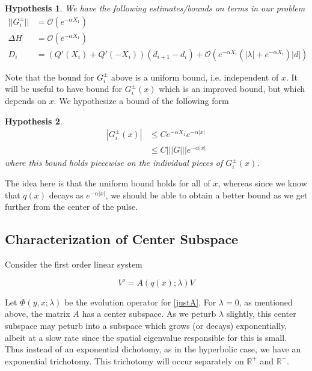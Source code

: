 \documentclass[12pt]{article}
\def\R{{\mathbb R}}
\newtheorem{hypothesis}{Hypothesis}
\begin{document}
\begin{hypothesis}\label{problembounds}
We have the following estimates/bounds on terms in our problem
\begin{align*}
||G_i^\pm|| &= \mathcal{O}(e^{-\alpha X_1}) \\
\Delta H &= \mathcal{O}(e^{-\alpha X_1}) \\
D_i &= ( Q'(X_i) + Q'(-X_i))(d_{i+1} - d_i ) + \mathcal{O} \left( e^{-\alpha X_i} \left( |\lambda| +  e^{-\alpha X_i}  \right) |d| \right)
\end{align*}
\end{hypothesis}

Note that the bound for $G_i^\pm$ above is a uniform bound, i.e. independent of $x$. It will be useful to have bound for $G_i^\pm(x)$ which is an improved bound, but which depends on $x$. We hypothesize a bound of the following form

\begin{hypothesis}\label{Gbound}
\begin{align*}
|G_i^\pm(x)| &\leq C e^{-\alpha X_1} e^{-\alpha |x|} \\
&\leq C |||G||| e^{-\alpha |x|}
\end{align*}
where this bound holds piecewise on the individual pieces of $G_i^\pm(x)$.
\end{hypothesis}

The idea here is that the uniform bound holds for all of $x$, whereas since we know that $q(x)$ decays as $e^{-\alpha |x|}$, we should be able to obtain a better bound as we get further from the center of the pulse.

\subsection{Characterization of Center Subspace}

Consider the first order linear system

\begin{equation}\label{justA}
V' = A(q(x); \lambda) V
\end{equation}

Let $\Phi(y, x; \lambda)$ be the evolution operator for \eqref{justA}. For $\lambda = 0$, as mentioned above, the matrix $A$ has a center subspace. As we peturb $\lambda$ slightly, this center subspace may peturb into a subspace which grows (or decays) exponentially, albeit at a slow rate since the spatial eigenvalue responsible for this is small. Thus instead of an exponential dichotomy, as in the hyperbolic case, we have an exponential trichotomy. This trichotomy will occur separately on $\R^+$ and $\R^-$.\\
\end{document}
